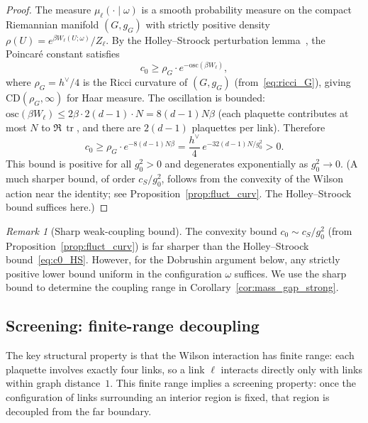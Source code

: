 \documentclass[11pt,a4paper]{article}
\theoremstyle{plain}
\theoremstyle{definition}
\theoremstyle{remark}
\newtheorem{remark}[theorem]{Remark}
\newcommand{\tr}{\operatorname{tr}}
\begin{document}
\begin{proof}
The measure $\mu_\ell(\cdot \mid \omega)$ is a smooth probability
measure on the compact Riemannian manifold $(G, g_G)$ with
strictly positive density $\rho(U) = e^{\beta W_\ell(U;\omega)} / Z_\ell$.
By the Holley--Stroock perturbation lemma~\cite{HolleyStroock},
the Poincar\'e constant satisfies
\begin{equation}
  c_0 \ge \rho_G \cdot e^{-\mathrm{osc}(\beta W_\ell)},
\end{equation}
where $\rho_G = h^\vee/4$ is the Ricci curvature of $(G, g_G)$
(from~\eqref{eq:ricci_G}), giving $\mathrm{CD}(\rho_G, \infty)$
for Haar measure.  The oscillation is bounded:
$\mathrm{osc}(\beta W_\ell) \le 2\beta \cdot 2(d-1) \cdot N
= 8(d-1)N\beta$ (each plaquette contributes at most $N$ to
$\Re\,\tr$, and there are $2(d-1)$ plaquettes per link).
Therefore
\begin{equation}\label{eq:c0_HS}
  c_0 \ge \rho_G \cdot e^{-8(d-1)N\beta}
  = \frac{h^\vee}{4}\,e^{-32(d-1)N/g_0^2} > 0.
\end{equation}
This bound is positive for all $g_0^2 > 0$ and degenerates
exponentially as $g_0^2 \to 0$.  (A much sharper bound, of
order $c_S/g_0^2$, follows from the convexity of the Wilson
action near the identity; see Proposition~\ref{prop:fluct_curv}.
The Holley--Stroock bound suffices here.)
\end{proof}

\begin{remark}[Sharp weak-coupling bound]
The convexity bound $c_0 \sim c_S/g_0^2$ (from
Proposition~\ref{prop:fluct_curv}) is far sharper than the
Holley--Stroock bound~\eqref{eq:c0_HS}.  However, for the
Dobrushin argument below, any strictly positive lower bound
uniform in the configuration $\omega$ suffices.  We use the
sharp bound to determine the coupling range in
Corollary~\ref{cor:mass_gap_strong}.
\end{remark}

\subsection{Screening: finite-range decoupling}

The key structural property is that the Wilson interaction
has finite range: each plaquette involves exactly four links,
so a link $\ell$ interacts directly only with links within
graph distance~$1$.  This finite range implies a screening
property: once the configuration of links surrounding an
interior region is fixed, that region is decoupled from the
far boundary.
\end{document}

